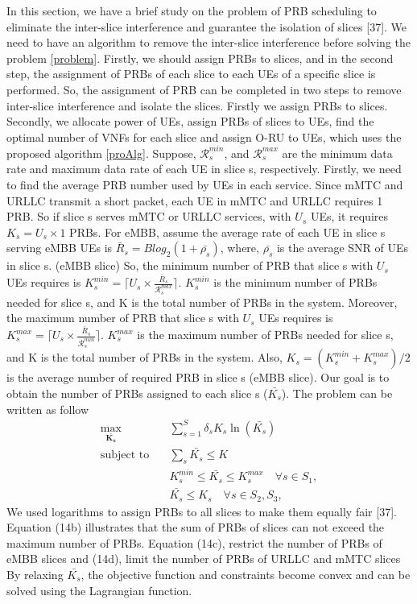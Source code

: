 \documentclass[12pt, letterpaper]{article}
\begin{document}
{ In this section, we have a brief study on the problem of PRB scheduling to eliminate  the inter-slice interference and guarantee the isolation of slices [37].
We need to have an algorithm to remove the inter-slice interference before solving the problem \ref{problem}. Firstly, we should assign PRBs to slices, and in the second step, the assignment of PRBs of each slice to each UEs of a specific slice is performed. So, the assignment of PRB can be completed in two steps to remove inter-slice interference and isolate the slices. Firstly we assign PRBs to slices. Secondly, we allocate power of UEs, assign PRBs of slices to UEs, find the optimal number of VNFs for each slice and assign O-RU to UEs, which uses the proposed algorithm \ref{proAlg}.
Suppose, $\mathcal{R}_{{s}}^{min}$, and $\mathcal{R}_{{s}}^{max}$ are the minimum data rate and maximum data rate of each UE in slice s, respectively.
Firstly, we need to find the average PRB number used by UEs in each service. Since mMTC and URLLC transmit a short packet, each UE in mMTC and URLLC requires 1 PRB. So if slice s serves mMTC or URLLC services, with $U_s$ UEs, it requires $K_s = U_s \times 1$ PRBs. For eMBB, assume the average rate of each UE in slice s serving eMBB UEs is $\bar{R}_s = Blog_2(1 + \bar{\rho_s})$, where, $\bar{\rho_s}$ is the average SNR of UEs in slice s. (eMBB slice)
So, the minimum number of PRB that slice s with $U_s$ UEs requires is $K_s^{min} = \lceil{U_s \times \frac{\bar{R}_s}{\mathcal{R}_{{s}}^{max}}}\rceil$. $K_s^{min} $ is the minimum number of PRBs needed for slice s, and K is the total number of PRBs in the system.  
Moreover, the maximum number of PRB that slice s with $U_s$ UEs requires is $K_s^{max} = \lceil{U_s \times \frac{\bar{R}_s}{\mathcal{R}_{{s}}^{min}}}\rceil$. $K_s^{max} $ is the maximum number of PRBs needed for slice s, and K is the total number of PRBs in the system. Also, $K_s = (K_s^{min}+K_s^{max})/2$ is the average number of required PRB in slice s (eMBB slice).
Our goal is to obtain the number of PRBs assigned to each slice s ($\bar{K_s}$).
The problem can be written as follow
\begin{subequations}\label{prob:prb}
\begin{alignat}{4}
\max\limits_{\boldsymbol{\bar{K_s}}} \quad &  \sum_{s=1}^{S}\delta_s K_s \ln(\bar{K_s}) \ \\
\text{subject to} \quad  & \sum_s{\bar{K_s}} \leq K
 \label{prb0} \\
& K_s^{min} \leq \bar{K_s}  \leq K_s^{max}  \quad \forall s \in S_1,\label{prb1} \\
&  \bar{K_s} \leq K_s  \quad \forall s \in S_2, S_3,\label{prb2}
\end{alignat}
\label{constraints}
\end{subequations}
We used logarithms to assign PRBs to all slices to make
them equally fair [37]. Equation (14b) illustrates that the
sum of PRBs of slices can not exceed the maximum number
of PRBs. Equation (14c), restrict the number of PRBs
of eMBB slices and (14d), limit the number of PRBs of
URLLC and mMTC slices By relaxing $\bar{K_s}$, the objective function and constraints become convex and can be solved using the Lagrangian function.

}
\end{document}
